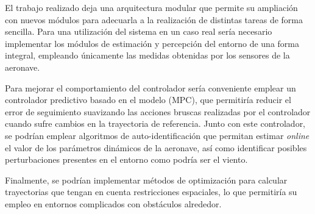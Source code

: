 El trabajo realizado deja una arquitectura modular que permite su ampliación con nuevos módulos para adecuarla a la realización de distintas tareas de forma sencilla. Para una utilización del sistema en un caso real sería necesario implementar los módulos de estimación y percepción del entorno de una forma integral, empleando únicamente las medidas obtenidas por los sensores de la aeronave. 

Para mejorar el comportamiento del controlador sería conveniente emplear un controlador predictivo basado en el modelo (MPC), que permitiría reducir el error de seguimiento suavizando las acciones bruscas realizadas por el controlador cuando sufre cambios en la trayectoria de referencia. Junto con este controlador, se podrían emplear algoritmos de auto-identificación que permitan estimar \textit{online} el valor de los parámetros dinámicos de la aeronave, así como identificar posibles perturbaciones presentes en el entorno como podría ser el viento.

Finalmente, se podrían implementar métodos de optimización para calcular trayectorias que tengan en cuenta restricciones espaciales, lo que permitiría su empleo en entornos complicados con obstáculos alrededor. 











